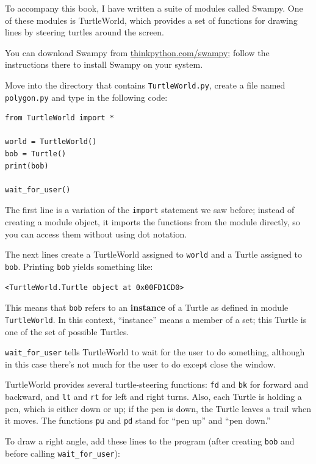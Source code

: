\documentclass[10pt]{book}
\begin{document}
To accompany this book, I have written a suite of modules called
Swampy.  One of these modules is TurtleWorld, which provides
a set of functions for drawing lines by steering
turtles around the screen.

You can download Swampy from \url{thinkpython.com/swampy};
follow the instructions there to install Swampy on your system.

Move into the directory that contains {\tt TurtleWorld.py},
create a file named {\tt polygon.py} and type in the following
code:

\beforeverb
\begin{verbatim}
from TurtleWorld import *

world = TurtleWorld()
bob = Turtle()
print(bob)

wait_for_user()
\end{verbatim}
\afterverb
%
The first line is a variation of the {\tt import} statement we saw before;
instead of creating a module object, it imports the functions
from the module directly, so you can access them without using dot
notation.


The next lines create a TurtleWorld assigned to {\tt world} and
a Turtle assigned to {\tt bob}.  Printing {\tt bob} yields something
like:

\beforeverb
\begin{verbatim}
<TurtleWorld.Turtle object at 0x00FD1CD0>
\end{verbatim}
\afterverb
%
This means that {\tt bob} refers to
an {\bf instance} of a Turtle
as defined in module {\tt TurtleWorld}.  In this context,
``instance'' means a member of a set;
this Turtle is one of the set of possible Turtles.


\verb"wait_for_user" tells TurtleWorld to wait for the user
to do something, although in this case there's not much for
the user to do except close the window.

TurtleWorld provides several
turtle-steering functions: {\tt fd} and {\tt bk} for
forward and backward, and {\tt lt} and {\tt rt} for left and
right turns.  Also, each Turtle is holding a pen, which is
either down or up; if the pen is down, the Turtle leaves
a trail when it moves.  The functions {\tt pu} and {\tt pd}
stand for ``pen up'' and ``pen down.''

To draw a right angle, add these lines to the program
(after creating {\tt bob} and before calling \verb"wait_for_user"):
\end{document}

